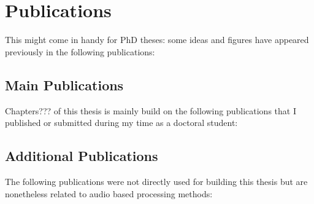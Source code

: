 \chapter*{Publications}
This might come in handy for PhD theses: some ideas and figures have appeared previously in the following publications:


\begin{refsection}
\section{Main Publications}
Chapters??? of this thesis is mainly build on the following publications that I published or submitted during my time as a doctoral student:
\nocite{*}
\printbibliography[heading=none]
\end{refsection}

\begin{refsection}
\section{Additional Publications}
The following publications were not directly used for building this thesis but are nonetheless related to audio based processing methods:
\nocite{*}
\printbibliography[heading=none]
\end{refsection}
